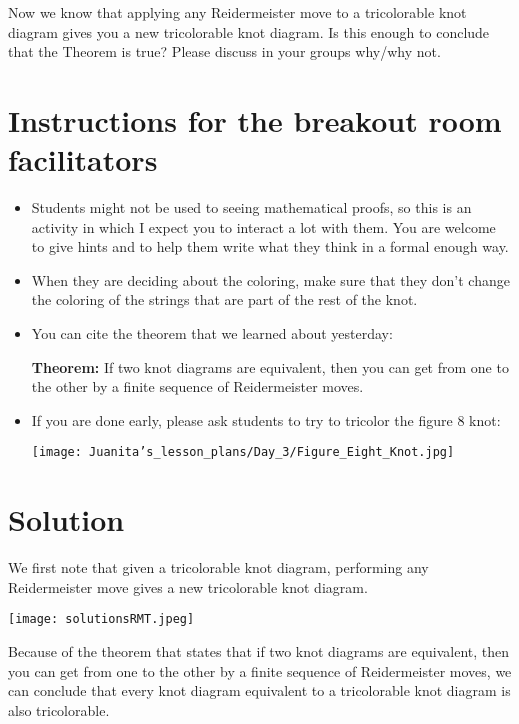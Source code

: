 \documentclass[12pt,letterpaper]{article}
\begin{document}
Now we know that applying any Reidermeister move to a tricolorable knot diagram gives you a new tricolorable knot diagram. Is this enough to conclude that the Theorem is true? Please discuss in your groups why/why not.

\newpage
\section*{Instructions for the breakout room facilitators}

\begin{itemize}
    \item Students might not be used to seeing mathematical proofs, so this is an activity in which I expect you to interact a lot with them. You are welcome to give hints and to help them write what they think in a formal enough way.
    
    \item When they are deciding about the coloring, make sure that they don't change the coloring of the strings that are part of the rest of the knot.
    
    \item You can cite the theorem that we learned about yesterday:
    
    \textbf{Theorem:} If two knot diagrams are equivalent, then you can get from one to the other by a finite sequence of Reidermeister moves.
    
    \item If you are done early, please ask students to try to tricolor the figure 8 knot:
    
    \texttt{[image: Juanita's\_lesson\_plans/Day\_3/Figure\_Eight\_Knot.jpg]}
    
\end{itemize}

\newpage

\section*{Solution}

We first note that given a tricolorable knot diagram, performing any Reidermeister move gives a new tricolorable knot diagram.

\texttt{[image: solutionsRMT.jpeg]}

Because of the theorem that states that if two knot diagrams are equivalent, then you can get from one to the other by a finite sequence of Reidermeister moves, we can conclude that every knot diagram equivalent to a tricolorable knot diagram is also tricolorable.
\end{document}
